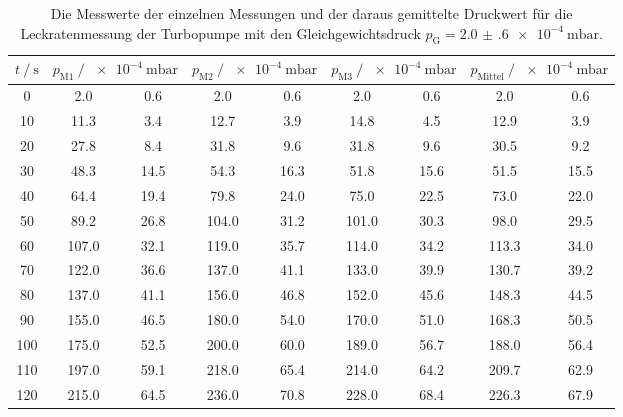   \begin{table}[h]
    \centering
    \caption{Die Messwerte der einzelnen Messungen und der daraus gemittelte Druckwert für die Leckratenmessung der Turbopumpe mit den Gleichgewichtsdruck
              $p_\text{G} = \SI{2.0(6)e-4}{\milli\bar}$.}
    \label{tab:turbo_leck_2}
    \begin{tabular}{S[table-format=3.0] S @{${}\pm{}$} S[table-format=2.1] S @{${}\pm{}$} S[table-format=2.1] S @{${}\pm{}$} S[table-format=2.1] S @{${}\pm{}$} S[table-format=2.1]}
    \toprule
    {$t \mathbin{/} \si{\second} $} &  &  &  &  \\
       &   2.0 &  0.6 &   2.0 &  0.6 &   2.0 &  0.6 &   2.0 &  0.6 \\
    10  &  11.3 &  3.4 &  12.7 &  3.9 &  14.8 &  4.5 &  12.9 &  3.9 \\
    20  &  27.8 &  8.4 &  31.8 &  9.6 &  31.8 &  9.6 &  30.5 &  9.2 \\
    30  &  48.3 & 14.5 &  54.3 & 16.3 &  51.8 & 15.6 &  51.5 & 15.5 \\
    40  &  64.4 & 19.4 &  79.8 & 24.0 &  75.0 & 22.5 &  73.0 & 22.0 \\
    50  &  89.2 & 26.8 & 104.0 & 31.2 & 101.0 & 30.3 &  98.0 & 29.5 \\
    60  & 107.0 & 32.1 & 119.0 & 35.7 & 114.0 & 34.2 & 113.3 & 34.0 \\
    70  & 122.0 & 36.6 & 137.0 & 41.1 & 133.0 & 39.9 & 130.7 & 39.2 \\
    80  & 137.0 & 41.1 & 156.0 & 46.8 & 152.0 & 45.6 & 148.3 & 44.5 \\
    90  & 155.0 & 46.5 & 180.0 & 54.0 & 170.0 & 51.0 & 168.3 & 50.5 \\
    100 & 175.0 & 52.5 & 200.0 & 60.0 & 189.0 & 56.7 & 188.0 & 56.4 \\
    110 & 197.0 & 59.1 & 218.0 & 65.4 & 214.0 & 64.2 & 209.7 & 62.9 \\
    120 & 215.0 & 64.5 & 236.0 & 70.8 & 228.0 & 68.4 & 226.3 & 67.9 \\

\end{tabular}
\end{table}
